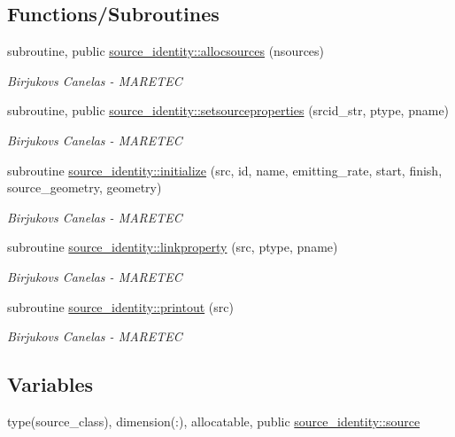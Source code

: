 \subsection*{Functions/\+Subroutines}
\begin{DoxyCompactItemize}
\item 
subroutine, public \hyperlink{namespacesource__identity_a716b4cb4acec5756a6d4dcf20eee588e}{source\+\_\+identity\+::allocsources} (nsources)
\begin{DoxyCompactList}\small\item\em Birjukovs Canelas -\/ M\+A\+R\+E\+T\+EC \end{DoxyCompactList}\item 
subroutine, public \hyperlink{namespacesource__identity_a8b07a03d4f79249743896163e9c85f55}{source\+\_\+identity\+::setsourceproperties} (srcid\+\_\+str, ptype, pname)
\begin{DoxyCompactList}\small\item\em Birjukovs Canelas -\/ M\+A\+R\+E\+T\+EC \end{DoxyCompactList}\item 
subroutine \hyperlink{namespacesource__identity_a8d7aaa58c575f6ed78f5ca29d64615d7}{source\+\_\+identity\+::initialize} (src, id, name, emitting\+\_\+rate, start, finish, source\+\_\+geometry, geometry)
\begin{DoxyCompactList}\small\item\em Birjukovs Canelas -\/ M\+A\+R\+E\+T\+EC \end{DoxyCompactList}\item 
subroutine \hyperlink{namespacesource__identity_a43fd5b86e85ddeadf982708445286e26}{source\+\_\+identity\+::linkproperty} (src, ptype, pname)
\begin{DoxyCompactList}\small\item\em Birjukovs Canelas -\/ M\+A\+R\+E\+T\+EC \end{DoxyCompactList}\item 
subroutine \hyperlink{namespacesource__identity_a9715a7d707b4c80aa2d2ebd08712f6a9}{source\+\_\+identity\+::printout} (src)
\begin{DoxyCompactList}\small\item\em Birjukovs Canelas -\/ M\+A\+R\+E\+T\+EC \end{DoxyCompactList}\end{DoxyCompactItemize}
\subsection*{Variables}
\begin{DoxyCompactItemize}
\item 
type(source\+\_\+class), dimension(\+:), allocatable, public \hyperlink{namespacesource__identity_a5ed8006613af7461c6a2ff1cdaeb8f0f}{source\+\_\+identity\+::source}
\end{DoxyCompactItemize}
